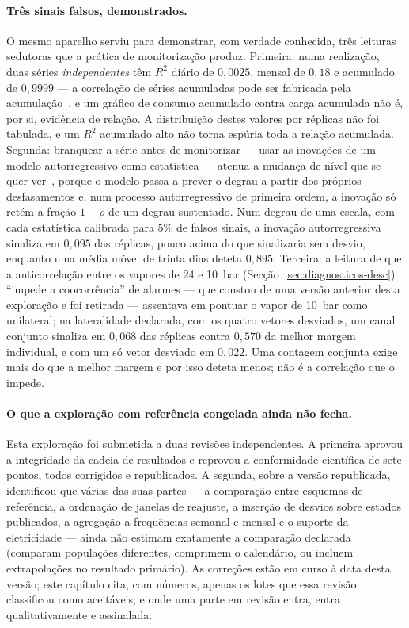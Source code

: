 \paragraph{Três sinais falsos, demonstrados.} O mesmo aparelho serviu para
demonstrar, com verdade conhecida, três leituras sedutoras que a prática de
monitorização produz. Primeira: numa realização, duas séries \emph{independentes} têm
$R^2$ diário de $0{,}0025$, mensal de $0{,}18$ e acumulado de $0{,}9999$ ---
a correlação de séries acumuladas pode ser fabricada pela
acumulação~\cite{Yule1926,GrangerNewbold1974}, e um gráfico de consumo
acumulado contra carga acumulada não é, por si, evidência de relação. A
distribuição destes valores por réplicas não foi tabulada, e um $R^2$
acumulado alto não torna espúria toda a relação acumulada. Segunda: branquear a série antes de monitorizar --- usar as
inovações de um modelo autorregressivo como estatística --- atenua a mudança
de nível que se quer ver~\cite{AlwanRoberts1988,Wardell1994}, porque o
modelo passa a prever o degrau a partir dos próprios desfasamentos e, num
processo autorregressivo de primeira ordem, a inovação só retém a fração
$1-\rho$ de um degrau sustentado. Num degrau de uma escala, com cada
estatística calibrada para $5\%$ de falsos sinais, a inovação
autorregressiva sinaliza em $0{,}095$ das réplicas, pouco acima do que
sinalizaria sem desvio, enquanto uma média móvel de trinta dias deteta
$0{,}895$. Terceira: a leitura de que a
anticorrelação entre os vapores de 24 e 10~bar
(Secção~\ref{sec:diagnosticos-desc}) ``impede a coocorrência'' de alarmes ---
que constou de uma versão anterior desta exploração e foi retirada ---
assentava em pontuar o vapor de 10~bar como unilateral; na lateralidade
declarada, com os quatro vetores desviados, um canal conjunto sinaliza em
$0{,}068$ das réplicas contra $0{,}570$ da melhor margem individual, e com um
só vetor desviado em $0{,}022$. Uma contagem conjunta exige mais do que a
melhor margem e por isso deteta menos; não é a correlação que o impede.

\paragraph{O que a exploração com referência congelada ainda não fecha.}
Esta exploração foi submetida a duas revisões independentes. A primeira
aprovou a integridade da cadeia de resultados e reprovou a conformidade
científica de sete pontos, todos corrigidos e republicados. A segunda,
sobre a versão republicada, identificou que várias das suas partes --- a
comparação entre esquemas de referência, a ordenação de janelas de
reajuste, a inserção de desvios sobre estados publicados, a agregação a
frequências semanal e mensal e o suporte da eletricidade --- ainda não
estimam exatamente a comparação declarada (comparam populações diferentes,
comprimem o calendário, ou incluem extrapolações no resultado primário). As
correções estão em curso à data desta versão; este capítulo cita, com
números, apenas os lotes que essa revisão classificou como aceitáveis, e
onde uma parte em revisão entra, entra qualitativamente e assinalada.


